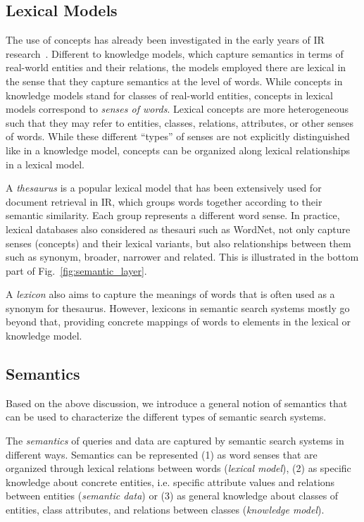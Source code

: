 \subsection{Lexical Models} The use of concepts has already been investigated in the early years of IR research~\cite{DBLP:conf/sigir/Giger88}. Different to knowledge models, which capture semantics in terms of real-world entities and their relations, the models employed there are lexical in the sense that they capture semantics at the level of words. While concepts in knowledge models stand for classes of real-world entities, concepts in lexical models correspond to \emph{senses of words}. 
Lexical concepts are more heterogeneous such that they may refer to entities, classes, relations, attributes, or other senses of words. While these different ``types'' of senses are not explicitly distinguished like in a knowledge model, concepts can be organized along lexical relationships in a lexical model. 

A \emph{thesaurus} 
is a popular lexical model that has been extensively used for document retrieval in IR, which groups words together according to their semantic similarity. Each group represents a different word sense. In practice, lexical databases also considered as thesauri such as WordNet, 
not only capture senses (concepts) and their lexical variants, but also relationships between them such as synonym, broader, narrower and related. This is illustrated in the bottom part of Fig.~\ref{fig:semantic_layer}.  

A \emph{lexicon} also aims to capture the meanings of words that is often used as a synonym for thesaurus. However, lexicons in semantic search systems mostly go beyond that, providing concrete mappings of words to elements in the lexical or knowledge model. 


\subsection{Semantics} 
Based on the above discussion, we introduce a general notion of semantics that can be used to characterize the different types of semantic search systems.

\begin{definition} The \emph{semantics} of queries and data are captured by semantic search systems in different ways. Semantics can be represented (1) as word senses that are organized through lexical relations between words (\emph{lexical model}), (2) as specific knowledge about concrete entities, i.e. specific attribute values and relations between entities (\emph{semantic data}) or (3) as general knowledge about classes of entities, class attributes, and relations between classes (\emph{knowledge model}). 
\end{definition}

